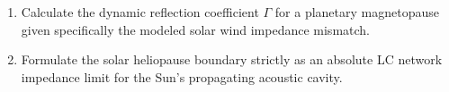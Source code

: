 \begin{exercisebox}
\begin{enumerate}
    \item Calculate the dynamic reflection coefficient $\Gamma$ for a planetary magnetopause given specifically the modeled solar wind impedance mismatch.
    \item Formulate the solar heliopause boundary strictly as an absolute LC network impedance limit for the Sun's propagating acoustic cavity.
\end{enumerate}
\end{exercisebox}
